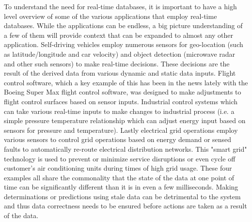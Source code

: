 \documentclass[conference]{IEEEtran}
\begin{document}
\indent To understand the need for real-time databases, it is important to have a high level overview of some of the various applications that employ real-time databases. While the applications can be endless, a big picture understanding of a few of them will provide context that can be expanded to almost any other application. Self-driving vehicles employ numerous sensors for geo-location (such as latitude/longitude and car velocity) and object detection (microwave radar and other such sensors) to make real-time decisions.  These decisions are the result of the derived data from various dynamic and static data inputs.  Flight control software, which a key example of this has been in the news lately with the Boeing Super Max flight control software, was designed to make adjustments to flight control surfaces based on sensor inputs.  Industrial control systems which can take various real-time inputs to make changes to industrial process (i.e. a simple pressure temperature relationship which can adjust energy input based on sensors for pressure and temperature). Lastly electrical grid operations employ various sensors to control grid operations based on energy demand or sensed faults to automatically re-route electrical distribution networks. This "smart grid" technology is used to prevent or minimize service disruptions or even cycle off customer's air conditioning units during times of high grid usage. These four examples all share the commonality that the state of the data at one point of time can be significantly different than it is in even a few milliseconds. Making determinations or predictions using stale data can be detrimental to the system and thus data correctness needs to be ensured before actions are taken as a result of the data.
\end{document}
